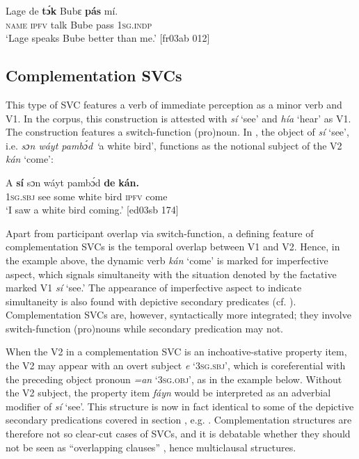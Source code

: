 \ea%
    \label{ex:key:1576}
    \gll Lage    de  \textbf{tɔ́k}    Bubɛ  \textbf{pás}    mí.\\
\textsc{name}  \textsc{ipfv}  talk    Bube  pass    \textsc{1sg.indp}\\

\glt ‘Lage speaks Bube better than me.’ [fr03ab 012]
\z

\subsection{Complementation SVCs}

This type of SVC features a verb of immediate perception as a minor verb and V1. In the corpus, this construction is attested with \textit{sí} ‘see’ and \textit{hía} ‘hear’ as V1. The construction features a switch-function (pro)noun. In , the object of \textit{sí} ‘see’, i.e. \textit{sɔn wáyt pambɔ́d ‘}a white bird’, functions as the notional subject of the V2 \textit{kán} ‘come’: 


\ea%
    \label{ex:key:1577}
    \gll \MakeUppercase{A}   \textbf{sí}  sɔn    wáyt  pambɔ́d  \textbf{de}  \textbf{kán}\textbf{\textmd{.}}\\
\textsc{1sg.sbj}  see  some  white  bird    \textsc{ipfv}  come\\

\glt ‘I saw a white bird coming.’ [ed03sb 174]
\z

Apart from participant overlap via switch-function, a defining feature of complementation SVCs is the temporal overlap between V1 and V2. Hence, in the example above, the dynamic verb \textit{kán} ‘come’ is marked for imperfective aspect, which signals simultaneity with the situation denoted by the factative marked V1 \textit{sí} ‘see.’ The appearance of imperfective aspect to indicate simultaneity is also found with depictive secondary predicates (cf. ). Complementation SVCs are, however, syntactically more integrated; they involve switch-function (pro)nouns while secondary predication may not.


When the V2 in a complementation SVC is an inchoative-stative property item, the V2 may appear with an overt subject \textit{e} ‘\textsc{3sg.sbj}’, which is coreferential with the preceding object pronoun \textit{=an} ‘\textsc{3sg.obj}’, as in the example below. Without the V2 subject, the property item \textit{fáyn} would be interpreted as an adverbial modifier of \textit{sí} ‘see’. This structure is now in fact identical to some of the depictive secondary predications covered in section , e.g. . Complementation structures are therefore not so clear-cut cases of SVCs, and it is debatable whether they should not be seen as “overlapping clauses” \citep{Ameka2006}, hence multiclausal structures. 



